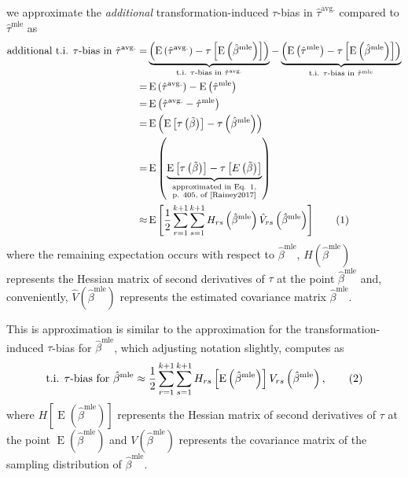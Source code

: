 \documentclass[10pt]{article}
\newcommand\numberthis{\addtocounter{equation}{1}\tag{\theequation}}
\DeclareMathOperator*{\E}{\text{E}}
\begin{document}
we approximate the \textit{additional} transformation-induced $\tau$-bias in $\hat{\tau}^\text{avg.}$ compared to $\hat{\tau}^\text{mle}$ as
\begin{align*}
\text{additional t.i. $\tau$-bias in } \hat{\tau}^\text{avg.} =& \underbrace{\left( \E \left( \hat{\tau}^\text{avg.}\right) - \tau \left[\E \left( \hat{\beta}^\text{mle} \right) \right] \right) }_{\text{t.i. } \tau\text{-bias in }\hat{\tau}^{\text{avg.}}} - \underbrace{ \left( \E \left( \hat{\tau}^\text{mle}\right) -  \tau \left[\E \left( \hat{\beta}^\text{mle} \right) \right] \right)}_{\text{t.i. } \tau\text{-bias in }\hat{\tau}^{\text{mle}}}\\
=& \E \left( \hat{\tau}^\text{avg.}\right) - \E \left( \hat{\tau}^\text{mle}\right)\\
=& \E \left( \hat{\tau}^\text{avg.} - \hat{\tau}^\text{mle} \right)\\
=& \E \left(     \E \left[ \tau\left( \tilde{\beta} \right) \right]      -      \tau \left( \hat{\beta}^\text{mle} \right)     \right)\\
=& \E \left(     \underbrace{\E \left[ \tau\left( \tilde{\beta} \right) \right]      -      \tau \left[ E\left(  \tilde{\beta} \right)\right]}_{\substack{\text{approximated in Eq. 1,} \\ \text{p. 405, of \cite{Rainey2017}}}}   \right)\\
\approx & \E \left[ \dfrac{1}{2} \displaystyle \sum_{r = 1}^{k+1} \sum_{s = 1}^{k+1} H_{rs}\left( \hat{\beta}^\text{mle} \right) \hat{V}_{rs} \left( \hat{\beta}^{\text{mle}} \right) \right] \numberthis \label{eqn:avg-approx}
\end{align*}
where the remaining expectation occurs with respect to $\hat{\beta}^\text{mle}$, $H\left( \hat{\beta}^\text{mle} \right)$ represents the Hessian matrix of second derivatives of $\tau$ at the point $\hat{\beta}^\text{mle}$ and, conveniently, $\hat{V} \left( \hat{\beta}^{\text{mle}} \right)$ represents the estimated covariance matrix $\hat{\beta}^\text{mle}$.  

This is approximation is similar to the approximation for the transformation-induced $\tau$-bias for $\hat{\beta}^\text{mle}$, which adjusting notation slightly, \citet[p. 405, Eq. 1]{Rainey2017} computes as 
\begin{align*}
\text{t.i. } \tau \text{-bias for } \hat{\beta}^\text{mle} \approx \dfrac{1}{2} \displaystyle \sum_{r = 1}^{k+1} \sum_{s = 1}^{k+1} H_{rs}\left[ \E \left( \hat{\beta}^\text{mle} \right) \right] V_{rs} \left( \hat{\beta}^{\text{mle}} \right), \numberthis \label{eqn:mle-approx}
\end{align*} 
where $H\left[ \E \left( \hat{\beta}^\text{mle} \right) \right]$ represents the Hessian matrix of second derivatives of $\tau$ at the point $\E \left( \hat{\beta}^\text{mle} \right)$ and $V \left( \hat{\beta}^{\text{mle}} \right)$ represents the covariance matrix of the sampling distribution of $\hat{\beta}^\text{mle}$.
\end{document}
